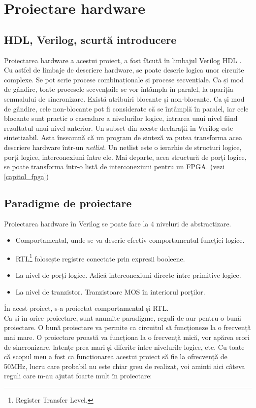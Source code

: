 \documentclass[12pt,twoside,a4paper,fleqn]{book}
\begin{document}
\chapter{Proiectare hardware}

\section{HDL, Verilog, scurtă introducere}
Proiectarea hardware a acestui proiect, a fost făcută în limbajul Verilog HDL \cite{peter_verilog}. Cu astfel de limbaje de descriere hardware, se poate descrie logica unor circuite complexe. Se pot scrie procese combinaționale și procese secvențiale. Ca și mod de gândire, toate procesele secvențaile se vor întâmpla în paralel, la apariția semnalului de sincronizare. Există atribuiri blocante și non-blocante. Ca și mod de gândire, cele non-blocante pot fi considerate că se întâmplă în paralel, iar cele blocante sunt practic o cascadare a nivelurilor logice, intrarea unui nivel fiind rezultatul unui nivel anterior. Un subset din aceste declarații în Verilog este sintetizabil. Asta înseamnă că un program de sinteză va putea transforma acea descriere hardware într-un \emph{netlist}. Un netlist este o ierarhie de structuri logice, porți logice, interconexiuni între ele. Mai departe, acea structură de porți logice, se poate transforma într-o listă de interconexiuni pentru un FPGA. (vezi \ref{capitol_fpga})\\

\section{Paradigme de proiectare}
Proiectarea hardware în Verilog se poate face la $4$ niveluri de abstractizare. 
\begin{itemize}
\item Comportamental, unde se va descrie efectiv comportamentul funcției logice.
\item RTL\footnote{Register Transfer Level.} folosește registre conectate prin expresii booleene.
\item La nivel de porți logice. Adică interconexiuni directe între primitive logice.
\item La nivel de tranzistor. Tranzistoare MOS în interiorul porților.
\end{itemize}
În acest proiect, s-a proiectat comportamental și RTL.\\
Ca și în orice proiectare, sunt anumite paradigme, reguli de aur pentru o bună proiectare. O bună proiectare va permite ca circuitul să funcționeze la o frecvență mai mare. O proiectare proastă va funcționa la o frecvență mică, vor apărea erori de sincronizare, latențe prea mari și diferite între nivelurile logice, etc. \cite{high_performance_fpga, peter_verilog, connexant, jack_marshall}
Cu toate că scopul meu a fost ca funcționarea acestui proiect să fie la  ofrecvență de 50MHz, lucru care probabil nu este chiar greu de realizat, voi aminti aici câteva reguli care m-au ajutat foarte mult în proiectare:
\end{document}
